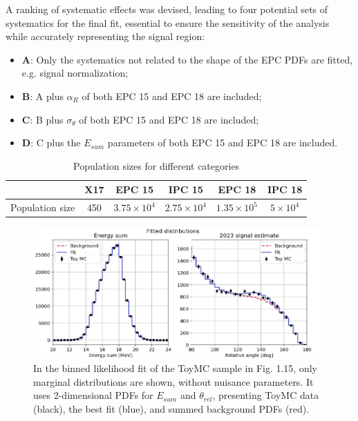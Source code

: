 \begin{refsection}
        \noindent
        A ranking of systematic effects was devised, leading to four potential sets of systematics for the final fit, essential to ensure the sensitivity of the analysis while accurately representing the signal region:
        \begin{itemize}
            \item \textbf{A}: Only the systematics not related to the shape of the EPC PDFs are fitted, e.g. signal normalization;
            \item \textbf{B}: A plus $\alpha_R$ of both EPC 15 and EPC 18 are included;
            \item \textbf{C}: B plus $\sigma_{\theta}$ of both EPC 15 and EPC 18 are included;
            \item \textbf{D}: C plus the $E_{sum}$ parameters of both EPC 15 and EPC 18 are included.
        \end{itemize}

        \begin{table}[htbp]
            \centering
            \caption{Population sizes for different categories}
            \begin{tabular}{|c|c|c|c|c|c|}
                \hline
                & X17 & EPC 15 & IPC 15 & EPC 18 & IPC 18 \\
                \hline
                Population size & 450 & $3.75 \times 10^4$ & $2.75 \times 10^4$ & $1.35 \times 10^5$ & $5 \times 10^4$ \\
                \hline
            \end{tabular}
            \label{tab:X17:populations}
        \end{table}

        \begin{figure}
            \centering
            \includegraphics[width=0.9\linewidth]{Figures//X17//Likelihood/examples-binned.png}
            \caption{In the binned likelihood fit of the ToyMC sample in Fig. 1.15, only marginal distributions are shown, without nuisance parameters. It uses 2-dimensional PDFs for $E_{sum}$ and $\theta_{rel}$, presenting ToyMC data (black), the best fit (blue), and summed background PDFs (red).}
            \label{fig:X17:binnedexample}
        \end{figure}
        

\end{refsection}
